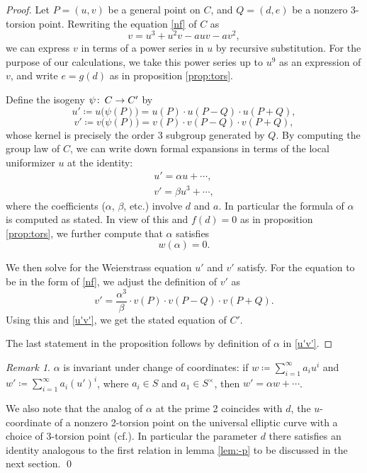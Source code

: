 \documentclass{gtpart}
\theoremstyle{definition}
\theoremstyle{remark}
\newtheorem{rmk}[thm]{Remark}
\def\co{\colon\thinspace}
\newcommand{\cff}[2]{cf.\thinspace{\cite[#1]{#2}}}
\newcommand{\A}{\alpha}
\begin{document}
\begin{proof}
 Let $P = (u,v)$ be a general point on $C$, and $Q = (d,e)$ be a nonzero 3-torsion point.  
 Rewriting the equation \eqref{nf} of $C$ as 
 \[
  v = u^3 + u^2 v - a u v - a v^2, 
 \]
 we can express $v$ in terms of a power series in $u$ by recursive substitution.  
 For the purpose of our calculations, we take this power series up to $u^9$ as an expression of $v$, 
 and write $e = g(d)$ as in proposition \ref{prop:tors}.  

 Define the isogeny $\psi \co C \to C'$ by 
 \[
  u' \coloneqq u\big(\psi(P)\big) = u(P) \cdot u(P-Q) \cdot u(P+Q), 
 \]
 \[
  v' \coloneqq v\big(\psi(P)\big) = v(P) \cdot v(P-Q) \cdot v(P+Q), 
 \]
 whose kernel is precisely the order 3 subgroup generated by $Q$.  
 By computing the group law of $C$, we can write down formal expansions in terms of the local uniformizer $u$ at the identity: 
 \begin{equation}
 \label{u'v'}
  \begin{array}{lll}
   u' = \A u + \cdots, \\
   v' = \beta u^3 + \cdots, 
  \end{array}
 \end{equation}
 where the coefficients ($\A$, $\beta$, etc.) involve $d$ and $a$.  In particular the formula of $\A$ is computed as stated.  
 In view of this and $f(d) = 0$ as in proposition \ref{prop:tors}, we further compute that $\A$ satisfies 
 \[
  w(\A) = 0.  
 \]

 We then solve for the Weierstrass equation $u'$ and $v'$ satisfy.  
 For the equation to be in the form of \eqref{nf}, we adjust the definition of $v'$ as 
 \[
  v' = \frac{\A^3}{\beta} \cdot v(P) \cdot v(P-Q) \cdot v(P+Q).  
 \]
 Using this and \eqref{u'v'}, we get the stated equation of $C'$.  

 The last statement in the proposition follows by definition of $\A$ in \eqref{u'v'}.  
\end{proof}

\begin{rmk}
 $\A$ is invariant under change of coordinates: 
 if $w \coloneqq \sum_{i = 1}^\infty a_i u^i$ and $w' \coloneqq \sum_{i = 1}^\infty a_i (u')^i$, 
 where $a_i \in S$ and $a_1 \in S^\times$, then $w' = \A w + \cdots$.  

 We also note that the analog of $\A$ at the prime 2 coincides with $d$, 
 the $u$-coordinate of a nonzero 2-torsion point on the universal elliptic curve with a choice of 3-torsion point (\cff{section 3}{h2p2}).  
 In particular the parameter $d$ there satisfies an identity analogous to the first relation in lemma \ref{lem:-p} to be discussed in the next section.  
\qed
\end{rmk}
\end{document}

